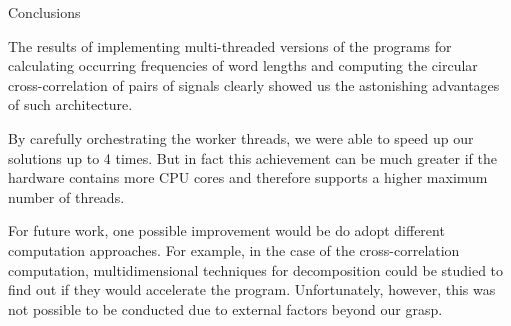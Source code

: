 \documentclass{beamer}
\begin{document}


\begin{frame}{Conclusions}

	The results of implementing multi-threaded versions of the programs for calculating occurring frequencies of word lengths and computing the circular
	cross-correlation of pairs of signals clearly showed us the astonishing advantages of such architecture.

	By carefully orchestrating the worker threads, we were able to speed up our solutions up to 4 times.
	But in fact this achievement can be much greater if the hardware contains more CPU cores and therefore supports a higher maximum number of threads.

	For future work, one possible improvement would be do adopt different computation approaches.
	For example, in the case of the cross-correlation computation, multidimensional techniques for decomposition could be studied to find out if they would
	accelerate the program.
	Unfortunately, however, this was not possible to be conducted due to external factors beyond our grasp.

\end{frame}
\end{document}
